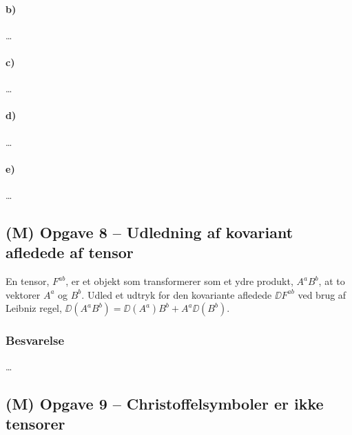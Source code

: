 \documentclass[../main.tex]{subfiles}
\begin{document}
\paragraph{b)}

\ldots



\paragraph{c)}

\ldots



\paragraph{d)}

\ldots



\paragraph{e)}

\ldots




\subsection{(M) Opgave 8 -- Udledning af kovariant afledede af tensor}
\setcounter{subsection}{8}
\setcounter{equation}{0}

En tensor, $F^{ab}$, er et objekt som transformerer som et ydre produkt, $A^a B^b$, at to vektorer $A^a$ og $B^b$. Udled et udtryk for den kovariante afledede $\DD F^{ab}$ ved brug af Leibniz regel, $\DD(A^a B^b) = \DD(A^a)B^b + A^a \DD (B^b)$.


\subsubsection{Besvarelse}

\ldots




\subsection{(M) Opgave 9 -- Christoffelsymboler er ikke tensorer}
\setcounter{subsection}{9}
\setcounter{equation}{0}
\end{document}
